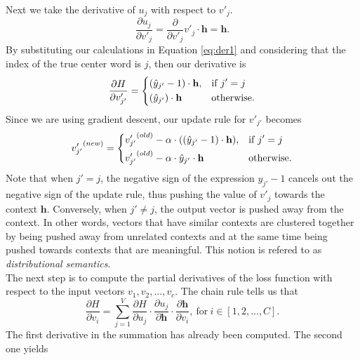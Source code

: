 \documentclass[english]{lni}
\begin{document}
Next we take the derivative of $u_{j}$ with respect to $v'_{j}$.
\begin{equation}
    \label{eq:hiddenvder}
    \frac{\partial u_{j}}{\partial v'_{j}} = \frac{\partial}{\partial v'_{j}}v'_{j}\cdot\textbf{h} = \textbf{h}.
\end{equation}
By substituting our calculations in Equation \ref{eq:der1} and considering that the index of the true center word is $j$, then 
our derivative is 
\begin{equation}
\frac{\partial H}{\partial v'_{j'}} = 
\begin{dcases}
    (\hat{y}_{j'}-1)\cdot\textbf{h},& \text{if } j'=j\\
    (\hat{y}_{j'})\cdot\textbf{h} & \text{otherwise.}
\end{dcases}
\end{equation}
Since we are using gradient descent, our update rule for $v'_{j'}$ becomes 
\begin{equation}
\label{eq:vjder1}
{v'_{j'}}^{(new)} = 
\begin{dcases}
    {v'_{j'}}^{(old)} - \alpha\cdot((\hat{y}_{j'}-1)\cdot\textbf{h}),& \text{if } j'=j\\
    {v'_{j'}}^{(old)} - \alpha\cdot\hat{y}_{j'}\cdot\textbf{h} & \text{otherwise.}
\end{dcases}
\end{equation}
Note that when $j' = j$, the negative sign of the expression $\hat{y}_{j'}-1$ cancels out the negative sign of the update rule, thus 
pushing the value of $v'_{j}$ towards the context $\textbf{h}$. Conversely, when $j' \neq j$, the output vector is pushed away from the context. 
In other words, vectors that have similar contexts are clustered together by being pushed away from unrelated contexts and at the same time being pushed towards contexts that are
meaningful. This notion is refered to as \textit{distributional semantics}.\\
The next step is to compute the partial derivatives of the loss function with respect to the input vectors $v_1, v_2,\hdots,v_c$.
The chain rule tells us that 
\begin{equation}
    \label{eq:der2}
    \frac{\partial H}{\partial v_i} = \sum_{j = 1}^{V}{\frac{\partial H}{\partial u_{j}}\cdot\frac{\partial u_{j}}{\partial \textbf{h}}\cdot\frac{\partial \textbf{h}}{\partial v_{i}}}, \: \text{for} \: i \in [1, 2, \hdots, C].
\end{equation}
The first derivative in the summation has already been computed. The second one yields
\end{document}
